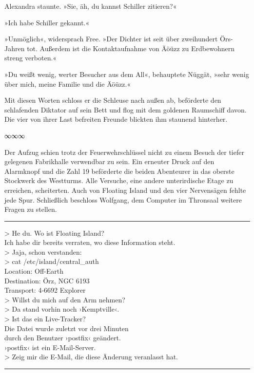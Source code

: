 Alexandra staunte. »Sie, äh, du kannst Schiller zitieren?«

»Ich habe Schiller gekannt.«

»Unmöglich«, widersprach Free. »Der Dichter ist seit über zweihundert Örs-Jahren tot. Außerdem ist die Kontaktaufnahme von Äöüzz zu Erdbewohnern streng verboten.«

»Du weißt wenig, werter Besucher aus dem All«, behauptete Nüggät, »sehr wenig über mich, meine Familie und die Äöüzz.«

Mit diesen Worten schloss er die Schleuse nach außen ab, beförderte den schlafenden Diktator auf sein Bett und flog mit dem goldenen Raumschiff davon. Die vier von ihrer Last befreiten Freunde blickten ihm staunend hinterher.

\begin{center}
∞∞∞
\end{center}

Der Aufzug schien trotz der Feuerwehrschlüssel nicht zu einem Besuch der tiefer gelegenen Fabrikhalle verwendbar zu sein. Ein erneuter Druck auf den Alarmknopf und die Zahl 19 beförderte die beiden Abenteurer in das oberste Stockwerk des Westturms. Alle Versuche, eine andere unterirdische Etage zu erreichen, scheiterten. Auch von Floating Island und den vier Nervensägen fehlte jede Spur. Schließlich beschloss Wolfgang, dem Computer im Thronsaal weitere Fragen zu stellen.

\noindent \parbox{\textwidth}{ \vspace{3ex} \hrule \vspace{3ex}

    \begin{tiny}
    \begin{ttfamily}

\noindent > He du. Wo ist Floating Island?\\
\noindent Ich habe dir bereits verraten, wo diese Information steht.\\
\noindent > Jaja, schon verstanden:\\
\noindent > cat /etc/island/central\_auth\\
\noindent Location: Off-Earth\\
\noindent Destination: Örz, NGC 6193\\
\noindent Transport: 4-6692 Explorer\\
\noindent > Willst du mich auf den Arm nehmen?\\
\noindent > Da stand vorhin noch ›Kemptville‹.\\
\noindent > Ist das ein Live-Tracker?\\
\noindent Die Datei wurde zuletzt vor drei Minuten\\
\noindent durch den Benutzer ›postfix‹ geändert.\\
\noindent ›postfix‹ ist ein E-Mail-Server.\\
\noindent > Zeig mir die E-Mail, die diese Änderung veranlasst hat.

    \end{ttfamily}
    \end{tiny}

\vspace{3ex} \hrule \vspace{3ex} }

